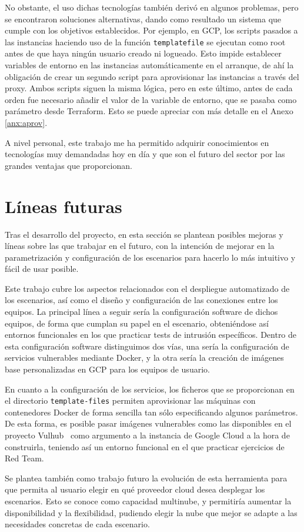   No obstante, el uso dichas tecnologías también derivó en algunos problemas, pero se encontraron soluciones alternativas, dando como resultado un sistema que cumple con los objetivos establecidos. Por ejemplo, en GCP, los scripts pasados a las instancias haciendo uso de la función \texttt{templatefile} se ejecutan como root antes de que haya ningún usuario creado ni logueado. Esto impide establecer variables de entorno en las instancias automáticamente en el arranque, de ahí la obligación de crear un segundo script para aprovisionar las instancias a través del proxy. Ambos scripts siguen la misma lógica, pero en este último, antes de cada orden fue necesario añadir el valor de la variable de entorno, que se pasaba como parámetro desde Terraform. Esto se puede apreciar con más detalle en el Anexo \ref{anx:aprov}. 

  A nivel personal, este trabajo me ha permitido adquirir conocimientos en tecnologías muy demandadas hoy en día y que son el futuro del sector por las grandes ventajas que proporcionan. 

\section{Líneas futuras} \label{sec:fut}
  Tras el desarrollo del proyecto, en esta sección se plantean posibles mejoras y líneas sobre las que trabajar en el futuro, con la intención de mejorar en la parametrización y configuración de los escenarios para hacerlo lo más intuitivo y fácil de usar posible.

  Este trabajo cubre los aspectos relacionados con el despliegue automatizado de los escenarios, así como el diseño y configuración de las conexiones entre los equipos. La principal línea a seguir sería la configuración software de dichos equipos, de forma que cumplan su papel en el escenario, obteniéndose así entornos funcionales en los que practicar tests de intrusión específicos. Dentro de esta configuración software distinguimos dos vías, una sería la configuración de servicios vulnerables mediante Docker, y la otra sería la creación de imágenes base personalizadas en GCP para los equipos de usuario.

  En cuanto a la configuración de los servicios, los ficheros que se proporcionan en el directorio \texttt{template-files} permiten aprovisionar las máquinas con contenedores Docker de forma sencilla tan sólo especificando algunos parámetros. De esta forma, es posible pasar imágenes vulnerables como las disponibles en el proyecto Vulhub~\cite{con1} como argumento a la instancia de Google Cloud a la hora de construirla, teniendo así un entorno funcional en el que practicar ejercicios de Red Team.

  Se plantea también como trabajo futuro la evolución de esta herramienta para que permita al usuario elegir en qué proveedor cloud desea desplegar los escenarios. Esto se conoce como capacidad multinube, y permitiría aumentar la disponibilidad y la flexibilidad, pudiendo elegir la nube que mejor se adapte a las necesidades concretas de cada escenario.
